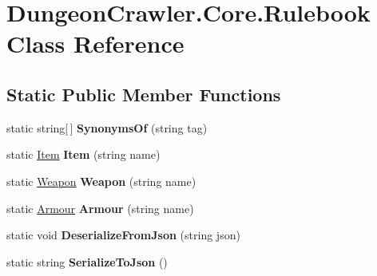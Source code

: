 \hypertarget{class_dungeon_crawler_1_1_core_1_1_rulebook}{}\section{Dungeon\+Crawler.\+Core.\+Rulebook Class Reference}
\label{class_dungeon_crawler_1_1_core_1_1_rulebook}
\subsection*{Static Public Member Functions}
\begin{DoxyCompactItemize}
\item 
\hypertarget{class_dungeon_crawler_1_1_core_1_1_rulebook_a8421b5449b51ff2de2256f88414b94db}{}static string\mbox{[}$\,$\mbox{]} {\bfseries Synonyms\+Of} (string tag)\label{class_dungeon_crawler_1_1_core_1_1_rulebook_a8421b5449b51ff2de2256f88414b94db}

\item 
\hypertarget{class_dungeon_crawler_1_1_core_1_1_rulebook_af8f68a06d3cc955b5251c26e4c21cb6b}{}static \hyperlink{class_dungeon_crawler_1_1_core_1_1_item}{Item} {\bfseries Item} (string name)\label{class_dungeon_crawler_1_1_core_1_1_rulebook_af8f68a06d3cc955b5251c26e4c21cb6b}

\item 
\hypertarget{class_dungeon_crawler_1_1_core_1_1_rulebook_a4567b47de0202da43ce45b8868681cd1}{}static \hyperlink{class_dungeon_crawler_1_1_core_1_1_weapon}{Weapon} {\bfseries Weapon} (string name)\label{class_dungeon_crawler_1_1_core_1_1_rulebook_a4567b47de0202da43ce45b8868681cd1}

\item 
\hypertarget{class_dungeon_crawler_1_1_core_1_1_rulebook_a36372fc256493e580b7745312d6bd41b}{}static \hyperlink{class_dungeon_crawler_1_1_core_1_1_armour}{Armour} {\bfseries Armour} (string name)\label{class_dungeon_crawler_1_1_core_1_1_rulebook_a36372fc256493e580b7745312d6bd41b}

\item 
\hypertarget{class_dungeon_crawler_1_1_core_1_1_rulebook_ad07da757abd45ca3e99c18be74ee845f}{}static void {\bfseries Deserialize\+From\+Json} (string json)\label{class_dungeon_crawler_1_1_core_1_1_rulebook_ad07da757abd45ca3e99c18be74ee845f}

\item 
\hypertarget{class_dungeon_crawler_1_1_core_1_1_rulebook_a9885764a9561d091f425316042987e8b}{}static string {\bfseries Serialize\+To\+Json} ()\label{class_dungeon_crawler_1_1_core_1_1_rulebook_a9885764a9561d091f425316042987e8b}

\end{DoxyCompactItemize}
